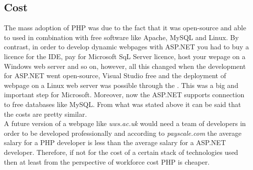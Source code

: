 \documentclass[11]{article}
\begin{document}

	

	\subsection{Cost}
	The mass adoption of PHP was due to the fact that it was open-source and able to used in combination with free software like Apache, MySQL and Linux. By contrast, in order to develop dynamic webpages with ASP.NET you had to buy a licence for the IDE, pay for Microsoft SqL Server licence, host your wepage on a Windows web server and so on, however, all this changed when the development for ASP.NET went open-source, Visual Studio free and the deployment of webpage on a Linux web server was possible through the \cite{Mono}. This was a big and important step for Microsoft. Moreover, now the ASP.NET supports connection to free databases like MySQL. From what was stated above it can be said that the costs are pretty similar.\\
	\indent
	A future version of a webpage like \textit{uws.ac.uk} would need a team of developers in order to be developed professionally and according to \textit{payscale.com} the average salary for a PHP developer is less than the average salary for a ASP.NET developer. Therefore, if not for the cost of a certain stack of technologies used then at least from the perspective of workforce cost PHP is cheaper.
\end{document}
